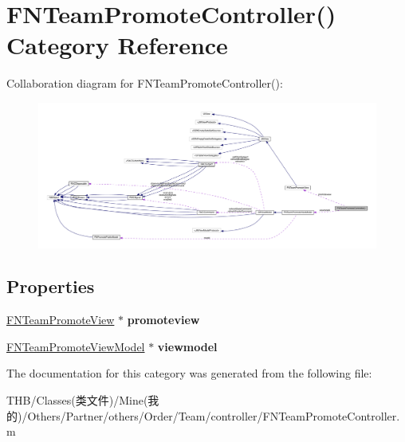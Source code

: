 \hypertarget{category_f_n_team_promote_controller_07_08}{}\section{F\+N\+Team\+Promote\+Controller() Category Reference}
\label{category_f_n_team_promote_controller_07_08}


Collaboration diagram for F\+N\+Team\+Promote\+Controller()\+:\nopagebreak
\begin{figure}[H]
\begin{center}
\leavevmode
\includegraphics[width=350pt]{category_f_n_team_promote_controller_07_08__coll__graph}
\end{center}
\end{figure}
\subsection*{Properties}
\begin{DoxyCompactItemize}
\item 
\mbox{\label{category_f_n_team_promote_controller_07_08_a5791503c7b8f94a6e7dbed4582ce8d50}} 
\mbox{\hyperlink{interface_f_n_team_promote_view}{F\+N\+Team\+Promote\+View}} $\ast$ {\bfseries promoteview}
\item 
\mbox{\label{category_f_n_team_promote_controller_07_08_af8ae5cc6021dfcd0789925d23353fc0f}} 
\mbox{\hyperlink{interface_f_n_team_promote_view_model}{F\+N\+Team\+Promote\+View\+Model}} $\ast$ {\bfseries viewmodel}
\end{DoxyCompactItemize}


The documentation for this category was generated from the following file\+:\begin{DoxyCompactItemize}
\item 
T\+H\+B/\+Classes(类文件)/\+Mine(我的)/\+Others/\+Partner/others/\+Order/\+Team/controller/F\+N\+Team\+Promote\+Controller.\+m\end{DoxyCompactItemize}
